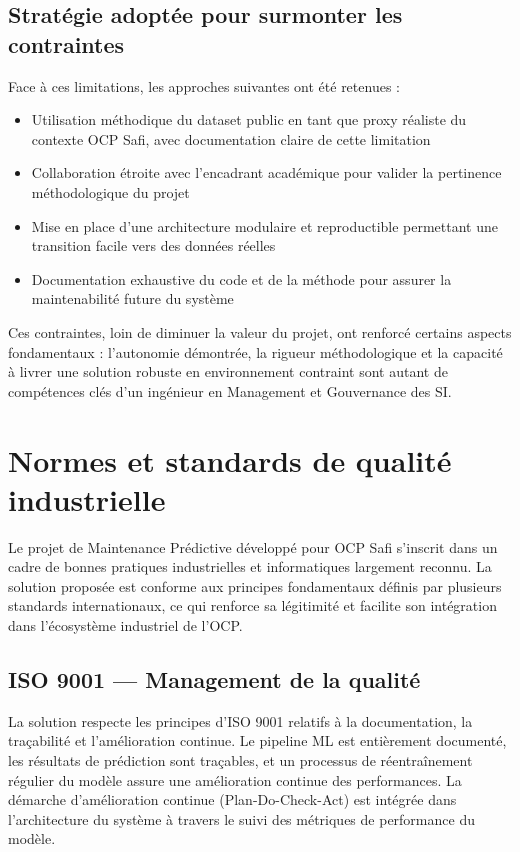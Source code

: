 \documentclass[a4paper,12pt]{report}
\begin{document}
\subsection{Stratégie adoptée pour surmonter les contraintes}

Face à ces limitations, les approches suivantes ont été retenues :

\begin{itemize}
    \item Utilisation méthodique du dataset public en tant que proxy réaliste du contexte OCP Safi, avec documentation claire de cette limitation
    \item Collaboration étroite avec l'encadrant académique pour valider la pertinence méthodologique du projet
    \item Mise en place d'une architecture modulaire et reproductible permettant une transition facile vers des données réelles
    \item Documentation exhaustive du code et de la méthode pour assurer la maintenabilité future du système
\end{itemize}

Ces contraintes, loin de diminuer la valeur du projet, ont renforcé certains aspects fondamentaux : l'autonomie démontrée, la rigueur méthodologique et la capacité à livrer une solution robuste en environnement contraint sont autant de compétences clés d'un ingénieur en Management et Gouvernance des SI.

\section{Normes et standards de qualité industrielle}

Le projet de Maintenance Prédictive développé pour OCP Safi s'inscrit dans un cadre de bonnes pratiques industrielles et informatiques largement reconnu. La solution proposée est conforme aux principes fondamentaux définis par plusieurs standards internationaux, ce qui renforce sa légitimité et facilite son intégration dans l'écosystème industriel de l'OCP.

\subsection{ISO 9001 — Management de la qualité}

La solution respecte les principes d'ISO 9001 relatifs à la documentation, la traçabilité et l'amélioration continue. Le pipeline ML est entièrement documenté, les résultats de prédiction sont traçables, et un processus de réentraînement régulier du modèle assure une amélioration continue des performances. La démarche d'amélioration continue (Plan-Do-Check-Act) est intégrée dans l'architecture du système à travers le suivi des métriques de performance du modèle.
\end{document}
